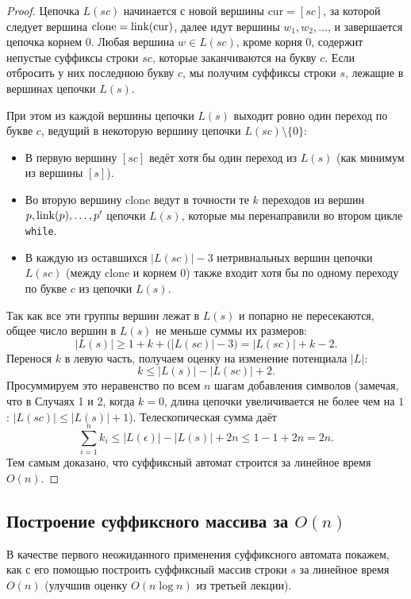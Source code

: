 \begin{proof}
    Цепочка $L(sc)$ начинается с новой вершины $\text{cur} = [sc]$, за которой следует вершина $\text{clone} = \operatorname{link}(\text{cur})$, далее идут вершины $w_1, w_2, \dots$, и завершается цепочка корнем $0$. Любая вершина $w \in L(sc)$, кроме корня $0$, содержит непустые суффиксы строки $sc$, которые заканчиваются на букву $c$. Если отбросить у них последнюю букву $c$, мы получим суффиксы строки $s$, лежащие в вершинах цепочки $L(s)$.

    При этом из каждой вершины цепочки $L(s)$ выходит ровно один переход по букве $c$, ведущий в некоторую вершину цепочки $L(sc) \setminus \{0\}$:
    \begin{itemize}
        \item В первую вершину $[sc]$ ведёт хотя бы один переход из $L(s)$ (как минимум из вершины $[s]$).
        \item Во вторую вершину $\text{clone}$ ведут в точности те $k$ переходов из вершин $p, \operatorname{link}(p), \dots, p'$ цепочки $L(s)$, которые мы перенаправили во втором цикле \texttt{while}.
        \item В каждую из оставшихся $|L(sc)| - 3$ нетривиальных вершин цепочки $L(sc)$ (между $\text{clone}$ и корнем $0$) также входит хотя бы по одному переходу по букве $c$ из цепочки $L(s)$.
    \end{itemize}
    Так как все эти группы вершин лежат в $L(s)$ и попарно не пересекаются, общее число вершин в $L(s)$ не меньше суммы их размеров:
    \[
        |L(s)| \ge 1 + k + \bigl(|L(sc)| - 3\bigr) = |L(sc)| + k - 2.
    \]
    Перенося $k$ в левую часть, получаем оценку на изменение потенциала $|L|$:
    \[
        k \le |L(s)| - |L(sc)| + 2.
    \]
    Просуммируем это неравенство по всем $n$ шагам добавления символов (замечая, что в Случаях 1 и 2, когда $k = 0$, длина цепочки увеличивается не более чем на $1$: $|L(sc)| \le |L(s)| + 1$). Телескопическая сумма даёт
    \[
        \sum_{i=1}^n k_i \le |L(\epsilon)| - |L(s)| + 2n \le 1 - 1 + 2n = 2n.
    \]
    Тем самым доказано, что суффиксный автомат строится за линейное время $O(n)$.
\end{proof}

\subsection{Построение суффиксного массива за \texorpdfstring{$O(n)$}{O(n)}}

В качестве первого неожиданного применения суффиксного автомата покажем, как с его помощью построить суффиксный массив строки $s$ за линейное время $O(n)$ (улучшив оценку $O(n \log n)$ из третьей лекции).


